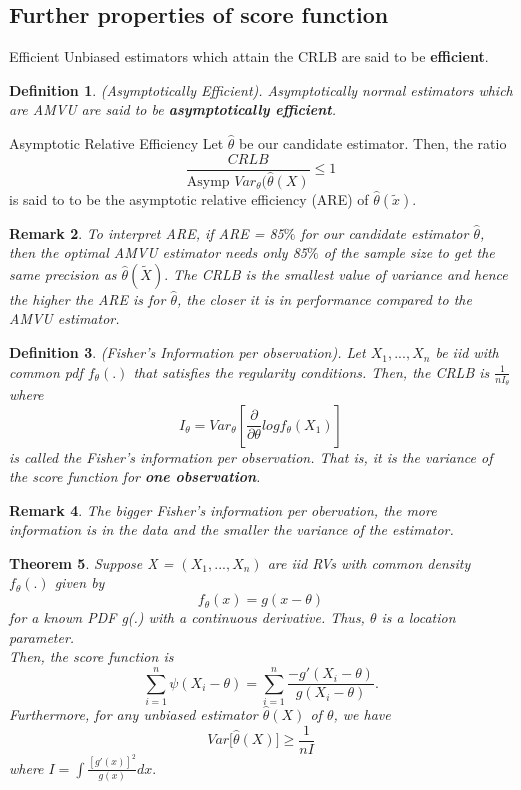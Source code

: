 \documentclass[twoside]{article}
\newcounter{lecnum}
\newtheorem{theorem}{Theorem}[lecnum]
\newtheorem{definition}[theorem]{Definition}
\newtheorem{remark}[theorem]{Remark}
\begin{document}
\subsection{Further properties of score function}

\begin{definition_exam}{Efficient}{} Unbiased estimators which attain the CRLB are said to be \textbf{efficient}.
\end{definition_exam}

\begin{definition}(Asymptotically Efficient). Asymptotically normal estimators which are AMVU are said to be \textbf{asymptotically efficient}.
\end{definition}
 

\begin{definition_exam}{Asymptotic Relative Efficiency}{} Let $\hat{\theta}$ be our candidate estimator. Then, the ratio 
$$
\frac{CRLB}{\text{Asymp }Var_{\theta}(\hat{\theta}(X)} \leq 1
$$
is said to to be the asymptotic relative efficiency (ARE) of $\hat{\theta}(\tilde{x}).$
\end{definition_exam}


\begin{remark}To interpret ARE, if ARE = 85$\%$ for our candidate estimator $\hat{\theta}$, then the optimal AMVU estimator needs only 85$\%$ of the sample size to get the same precision as $\hat{\theta}(\tilde{X}).$ The CRLB is the smallest value of variance and hence the higher the ARE is for $\hat{\theta}$, the closer it is in performance compared to the AMVU estimator.
\end{remark}

\begin{definition}(Fisher's Information per observation). Let $X_1,...,X_n$ be iid with common pdf $f_{\theta}(.)$ that satisfies the regularity conditions. Then, the CRLB is $\frac{1}{nI_{\theta}}$ where 
$$
I_{\theta} = Var_{\theta}[\frac{\partial}{\partial \theta}log f_{\theta}(X_1)]
$$
is called the Fisher's information per observation. That is, it is the variance of the score function for \textbf{one observation}. 
\end{definition}

\begin{remark}The bigger Fisher's information per obervation, the more information is in the data and the smaller the variance of the estimator.
\end{remark}

\begin{theorem}Suppose X = $(X_1,...,X_n)$ are iid RVs with common density $f_{\theta}(.)$ given by 
$$
f_{\theta}(x) = g(x - \theta)
$$
for a known PDF g(.) with a continuous derivative. Thus, $\theta$ is a location parameter.\\
Then, the score function is 
$$
\sum_{i=1}^{n}\psi(X_i - \theta) = \sum_{i=1}^{n}\frac{-g'(X_i - \theta)}{g(X_i - \theta)}.
$$
Furthermore, for any unbiased estimator $\hat{\theta}(X)$ of $\theta$, we have 
$$
Var\bigg[\hat{\theta}(X) \bigg] \geq \frac{1}{nI}
$$
where $I = \int \frac{[g'(x)]^2}{g(x)}dx.$
\end{theorem}
\end{document}
